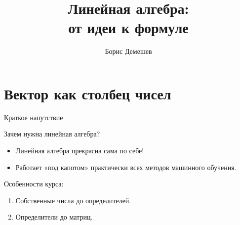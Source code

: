 \documentclass[14pt,xcolor=dvipsnames]{beamer}
\title{Линейная алгебра:\\ от идеи к формуле}
\date{}
\author{Борис Демешев}
\institute{НИУ ВШЭ}
\begin{document}
\maketitle





\section{Вектор как столбец чисел}


\begin{frame}{Краткое напутствие}

\begin{block}{Зачем нужна линейная алгебра?}
\begin{itemize}
  \item Линейная алгебра прекрасна сама по себе!
  \item Работает «под капотом» практически всех методов машинного обучения.
\end{itemize}
\end{block}

\begin{block}{Особенности курса:}
  \begin{enumerate}
    \item Собственные числа до определителей.
    \item Определители до матриц.
  \end{enumerate}
  
\end{block}

\end{frame}
\end{document}
